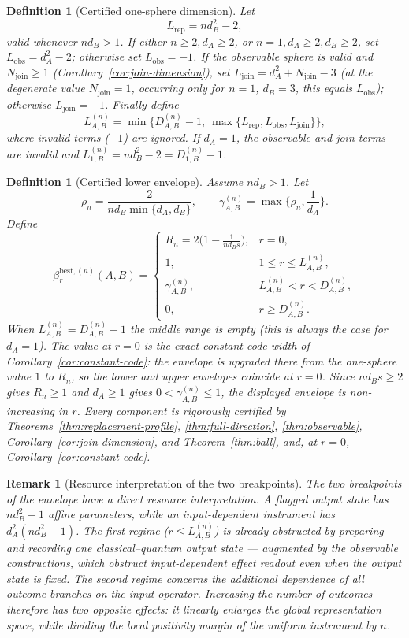 \documentclass[11pt,a4paper]{article}
\newtheorem{definition}[theorem]{Definition}
\newtheorem{remark}[theorem]{Remark}
\begin{document}
\begin{definition}[Certified one-sphere dimension]
\label{def:one-sphere}
Let
\[
L_{\mathrm{rep}}=nd_B^2-2,
\]
valid whenever $nd_B>1$. If either $n\ge2,d_A\ge2$, or $n=1,d_A\ge2,d_B\ge2$, set $L_{\mathrm{obs}}=d_A^2-2$; otherwise set $L_{\mathrm{obs}}=-1$. If the observable sphere is valid and $N_{\mathrm{join}}\ge1$ (Corollary~\ref{cor:join-dimension}), set $L_{\mathrm{join}}=d_A^2+N_{\mathrm{join}}-3$ (at the degenerate value $N_{\mathrm{join}}=1$, occurring only for $n=1$, $d_B=3$, this equals $L_{\mathrm{obs}}$); otherwise $L_{\mathrm{join}}=-1$. Finally define
\[
L_{A,B}^{(n)}
=\min\Big\{D_{A,B}^{(n)}-1,\ \max\{L_{\mathrm{rep}},L_{\mathrm{obs}},L_{\mathrm{join}}\}\Big\},
\]
where invalid terms ($-1$) are ignored. If $d_A=1$, the observable and join terms are invalid and $L_{1,B}^{(n)}=nd_B^2-2=D_{1,B}^{(n)}-1$.
\end{definition}

\begin{definition}[Certified lower envelope]
\label{def:beta-best}
Assume $nd_B>1$. Let
\[
\rho_n=\frac{2}{nd_B\min\{d_A,d_B\}},\qquad
\gamma_{A,B}^{(n)}=\max\Big\{\rho_n,\frac1{d_A}\Big\}.
\]
Define
\[
\beta_r^{\mathrm{best},(n)}(A,B)=
\begin{cases}
R_n=2\big(1-\tfrac{1}{nd_Bs}\big),&r=0,\\[3pt]
1,&1\le r\le L_{A,B}^{(n)},\\[3pt]
\gamma_{A,B}^{(n)},&L_{A,B}^{(n)}<r<D_{A,B}^{(n)},\\[6pt]
0,&r\ge D_{A,B}^{(n)}.
\end{cases}
\]
When $L_{A,B}^{(n)}=D_{A,B}^{(n)}-1$ the middle range is empty (this is always the case for $d_A=1$). The value at $r=0$ is the exact constant-code width of Corollary~\ref{cor:constant-code}: the envelope is upgraded there from the one-sphere value $1$ to $R_n$, so the lower and upper envelopes coincide at $r=0$. Since $nd_Bs\ge2$ gives $R_n\ge1$ and $d_A\ge1$ gives $0<\gamma_{A,B}^{(n)}\le1$, the displayed envelope is non-increasing in $r$. Every component is rigorously certified by Theorems~\ref{thm:replacement-profile}, \ref{thm:full-direction}, \ref{thm:observable}, Corollary~\ref{cor:join-dimension}, and Theorem~\ref{thm:ball}, and, at $r=0$, Corollary~\ref{cor:constant-code}.
\end{definition}

\begin{remark}[Resource interpretation of the two breakpoints]
\label{rem:breakpoints}
The two breakpoints of the envelope have a direct resource interpretation. A flagged output state has $nd_B^2-1$ affine parameters, while an input-dependent instrument has $d_A^2(nd_B^2-1)$. The first regime ($r\le L_{A,B}^{(n)}$) is already obstructed by preparing and recording one classical--quantum output state --- augmented by the observable constructions, which obstruct input-dependent effect readout even when the output state is fixed. The second regime concerns the additional dependence of all outcome branches on the input operator. Increasing the number of outcomes therefore has two opposite effects: it linearly enlarges the global representation space, while dividing the local positivity margin of the uniform instrument by $n$.
\end{remark}
\end{document}
